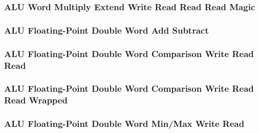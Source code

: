 

\subsubsection[{\small ALU Word Multiply Extend Write Read Read Read Magic}]{ALU Word Multiply Extend Write Read Read Read Magic} \label{sec:format-ALU-WMEWRRR.M}



\subsubsection[{\small ALU Floating-Point Double Word Add Subtract}]{ALU Floating-Point Double Word Add Subtract} \label{sec:format-ALU-FDADD}



\subsubsection[{\small ALU Floating-Point Double Word Comparison Write Read Read}]{ALU Floating-Point Double Word Comparison Write Read Read} \label{sec:format-ALU-FDCWRR}



\subsubsection[{\small ALU Floating-Point Double Word Comparison Write Read Read Wrapped}]{ALU Floating-Point Double Word Comparison Write Read Read Wrapped} \label{sec:format-ALU-FDCWRR.W}



\subsubsection[{\small ALU Floating-Point Double Word Min/Max Write Read}]{ALU Floating-Point Double Word Min/Max Write Read} \label{sec:format-ALU-FDMMWR}

